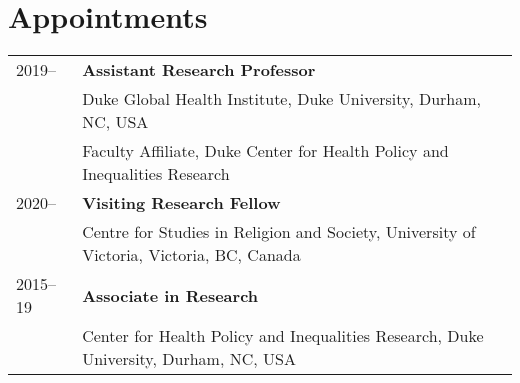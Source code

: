 \vspace{3ex}
\section*{Appointments}
\begin{longtable}{p{} p{}}
2019-- & \textbf{Assistant Research Professor}\\
		             & Duke Global Health Institute, Duke University, Durham, NC, USA \\
		             & Faculty Affiliate, Duke Center for Health Policy and Inequalities Research\\
2020-- & \textbf{Visiting Research Fellow}\\
	& Centre for Studies in Religion and Society, University of Victoria, Victoria, BC, Canada \\
	2015--19 & \textbf{Associate in Research}\\
	& Center for Health Policy and Inequalities Research, Duke University, Durham, NC, USA \\
\end{longtable}
